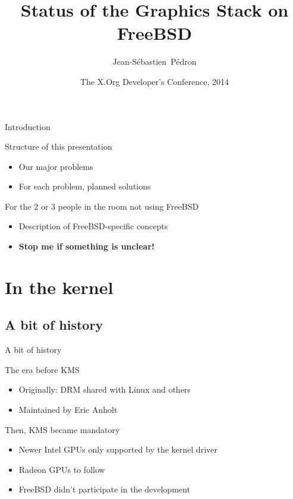 \documentclass{beamer}
\title[Graphics Stack on FreeBSD] %
{Status of the Graphics Stack on FreeBSD}
\author[J.S.~Pédron] %
{Jean-Sébastien~Pédron}
\institute[FreeBSD] %
{
  The FreeBSD Project}
\date[XDC 2014] %
{The X.Org Developer's Conference, 2014}
\begin{document}
\begin{frame}
  \titlepage
\end{frame}


\begin{frame}{Introduction}
  \begin{block}{Structure of this presentation}
    \begin{itemize}
      \item Our major problems
      \item For each problem, planned solutions
    \end{itemize}
  \end{block}
  \begin{block}{For the 2 or 3 people in the room not using FreeBSD}
    \begin{itemize}
      \item Description of FreeBSD-specific concepts
      \item \textbf{Stop me if something is unclear!}
    \end{itemize}
  \end{block}
\end{frame}

\section{In the kernel}

\subsection{A bit of history}

\begin{frame}{A bit of history}
  \begin{block}{The era before KMS}
    \begin{itemize}
      \item Originally: DRM shared with Linux and others
      \item Maintained by Eric Anholt
    \end{itemize}
  \end{block}
  \pause
  \begin{block}{Then, KMS became mandatory}
    \begin{itemize}
      \item Newer Intel GPUs only supported by the kernel driver
      \item Radeon GPUs to follow
      \item FreeBSD didn't participate in the development
    \end{itemize}
  \end{block}
\end{frame}
\end{document}
